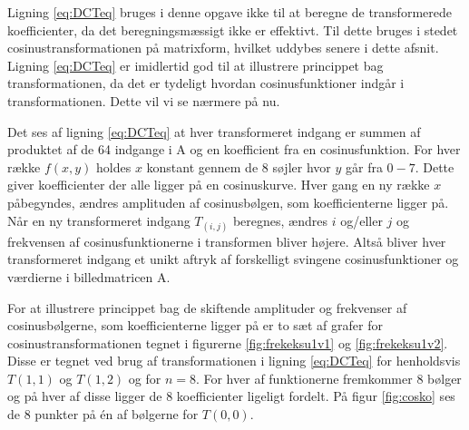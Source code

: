 Ligning \vref{eq:DCTeq} bruges i denne opgave ikke til at beregne de transformerede koefficienter, da det beregningsmæssigt ikke er effektivt. Til dette bruges i stedet cosinustransformationen på matrixform, hvilket uddybes senere i dette afsnit. Ligning \vref{eq:DCTeq} er imidlertid god til at illustrere princippet bag transformationen, da det er tydeligt hvordan cosinusfunktioner indgår i transformationen. Dette vil vi se nærmere på nu.

Det ses af ligning \vref{eq:DCTeq} at hver transformeret indgang er summen af produktet af de 64 indgange i A og en koefficient fra en cosinusfunktion. For hver række $f(x,y)$ holdes $x$ konstant gennem de 8 søjler hvor $y$ går fra $0-7$. Dette giver koefficienter der alle ligger på en cosinuskurve. Hver gang en ny række $x$ påbegyndes, ændres amplituden af cosinusbølgen, som koefficienterne ligger på.\\
Når en ny transformeret indgang $T_{(i,j)}$ beregnes, ændres $i$ og/eller $j$ og frekvensen af cosinusfunktionerne i transformen bliver højere. Altså bliver hver transformeret indgang et unikt aftryk af forskelligt svingene cosinusfunktioner og værdierne i billedmatricen A.

For at illustrere princippet bag de skiftende amplituder og frekvenser af cosinusbølgerne, som koefficienterne ligger på er to sæt af grafer for cosinustransformationen tegnet i figurerne \vref{fig:frekeksu1v1} og  \vref{fig:frekeksu1v2}. Disse er tegnet ved brug af transformationen i ligning \vref{eq:DCTeq} for henholdsvis $T(1,1)$ og $T(1,2)$ og for $n=8$. For hver af funktionerne fremkommer 8 bølger og på hver af disse ligger de 8 koefficienter ligeligt fordelt. På figur \vref{fig:cosko} ses de 8 punkter på én af bølgerne for $T(0,0)$.

